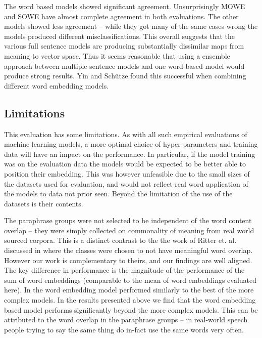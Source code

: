 \documentclass[]{book}
\begin{document}
The word based models showed significant agreement. Unsurprisingly
MOWE and SOWE have almost complete agreement in both evaluations.
The other models showed less agreement -- while they got many of the
same cases wrong the models produced different misclassifications.
This overall suggests that the various full sentence models are producing
substantially dissimilar maps from meaning to vector space. Thus it
seems reasonable that using a ensemble approach between multiple sentence
models and one word-based model would produce strong results. Yin
and Schütze \cite{Yin2015} found this successful when combining different
word embedding models.


\subsection{Limitations}

This evaluation has some limitations. As with all such empirical evaluations
of machine learning models, a more optimal choice of hyper-parameters
and training data will have an impact on the performance. In particular,
if the model training was on the evaluation data the models would
be expected to be better able to position their embedding. This was
however unfeasible due to the small sizes of the datasets used for
evaluation, and would not reflect real word application of the models
to data not prior seen. Beyond the limitation of the use of the datasets
is their contents.

The paraphrase groups were not selected to be independent of the word
content overlap -- they were simply collected on commonality of meaning
from real world sourced corpora. This is a distinct contrast to the
the work of Ritter et. al.\cite{RitterPosition} discussed in 
where the classes were chosen to not have meaningful word overlap.
However our work is complementary to theirs, and our findings are
well aligned. The key difference in performance is the magnitude of
the performance of the sum of word embeddings (comparable to the mean
of word embeddings evaluated here). In \cite{RitterPosition} the
word embedding model performed similarly to the best of the more complex
models. In the results presented above we find that the word embedding
based model performs significantly beyond the more complex models.
This can be attributed to the word overlap in the paraphrase groups
-- in real-world speech people trying to say the same thing do in-fact
use the same words very often.
\end{document}
